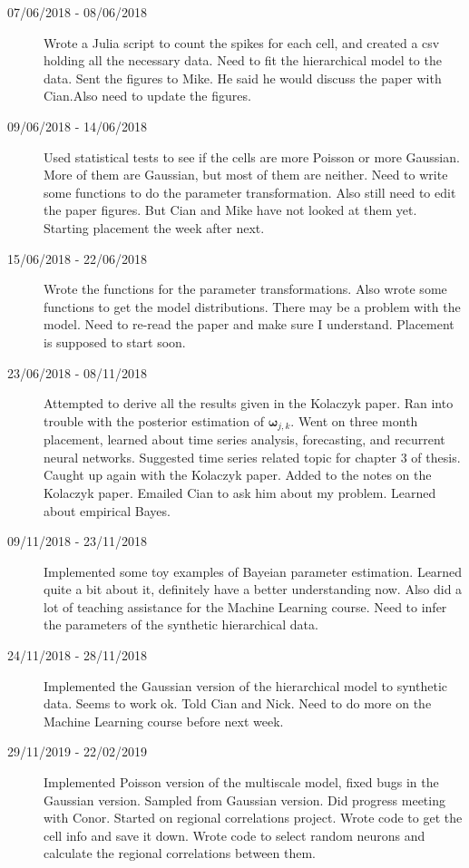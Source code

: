 \documentclass[a4paper,12pt]{article}
\theoremstyle{definition}
\begin{document}
\begin{description}
        \item[07/06/2018 - 08/06/2018] Wrote a Julia script to count the spikes for each cell, and created a csv holding all the necessary data. Need to fit the hierarchical model to the data. Sent the figures to Mike. He said he would discuss the paper with Cian.Also need to update the figures.

        \item[09/06/2018 - 14/06/2018] Used statistical tests to see if the cells are more Poisson or more Gaussian. More of them are Gaussian, but most of them are neither. Need to write some functions to do the parameter transformation. Also still need to edit the paper figures. But Cian and Mike have not looked at them yet. Starting placement the week after next.

        \item[15/06/2018 - 22/06/2018] Wrote the functions for the parameter transformations. Also wrote some functions to get the model distributions. There may be a problem with the model. Need to re-read the paper and make sure I understand. Placement is supposed to start soon.

				\item[23/06/2018 - 08/11/2018] Attempted to derive all the results given in the Kolaczyk paper. Ran into trouble with the posterior estimation of $\boldsymbol{\omega}_{j,k}$. Went on three month placement, learned about time series analysis, forecasting, and recurrent neural networks. Suggested time series related topic for chapter 3 of thesis. Caught up again with the Kolaczyk paper. Added to the notes on the Kolaczyk paper. Emailed Cian to ask him about my problem. Learned about empirical Bayes.

				\item[09/11/2018 - 23/11/2018] Implemented some toy examples of Bayeian parameter estimation. Learned quite a bit about it, definitely have a better understanding now. Also did a lot of teaching assistance for the Machine Learning course. Need to infer the parameters of the synthetic hierarchical data.

				\item[24/11/2018 - 28/11/2018] Implemented the Gaussian version of the hierarchical model to synthetic data. Seems to work ok. Told Cian and Nick. Need to do more on the Machine Learning course before next week.

				\item[29/11/2019 - 22/02/2019] Implemented Poisson version of the multiscale model, fixed bugs in the Gaussian version. Sampled from Gaussian version. Did progress meeting with Conor. Started on regional correlations project. Wrote code to get the cell info and save it down. Wrote code to select random neurons and calculate the regional correlations between them.


\end{description}
\end{document}
